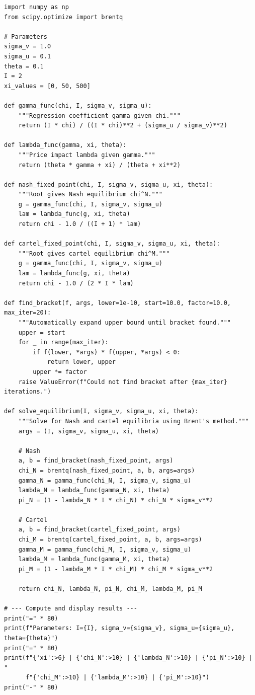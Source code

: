 \begin{lstlisting}[style=pythonstyle]
import numpy as np
from scipy.optimize import brentq

# Parameters
sigma_v = 1.0
sigma_u = 0.1
theta = 0.1
I = 2
xi_values = [0, 50, 500]

def gamma_func(chi, I, sigma_v, sigma_u):
    """Regression coefficient gamma given chi."""
    return (I * chi) / ((I * chi)**2 + (sigma_u / sigma_v)**2)

def lambda_func(gamma, xi, theta):
    """Price impact lambda given gamma."""
    return (theta * gamma + xi) / (theta + xi**2)

def nash_fixed_point(chi, I, sigma_v, sigma_u, xi, theta):
    """Root gives Nash equilibrium chi^N."""
    g = gamma_func(chi, I, sigma_v, sigma_u)
    lam = lambda_func(g, xi, theta)
    return chi - 1.0 / ((I + 1) * lam)

def cartel_fixed_point(chi, I, sigma_v, sigma_u, xi, theta):
    """Root gives cartel equilibrium chi^M."""
    g = gamma_func(chi, I, sigma_v, sigma_u)
    lam = lambda_func(g, xi, theta)
    return chi - 1.0 / (2 * I * lam)

def find_bracket(f, args, lower=1e-10, start=10.0, factor=10.0, max_iter=20):
    """Automatically expand upper bound until bracket found."""
    upper = start
    for _ in range(max_iter):
        if f(lower, *args) * f(upper, *args) < 0:
            return lower, upper
        upper *= factor
    raise ValueError(f"Could not find bracket after {max_iter} iterations.")

def solve_equilibrium(I, sigma_v, sigma_u, xi, theta):
    """Solve for Nash and cartel equilibria using Brent's method."""
    args = (I, sigma_v, sigma_u, xi, theta)

    # Nash
    a, b = find_bracket(nash_fixed_point, args)
    chi_N = brentq(nash_fixed_point, a, b, args=args)
    gamma_N = gamma_func(chi_N, I, sigma_v, sigma_u)
    lambda_N = lambda_func(gamma_N, xi, theta)
    pi_N = (1 - lambda_N * I * chi_N) * chi_N * sigma_v**2

    # Cartel
    a, b = find_bracket(cartel_fixed_point, args)
    chi_M = brentq(cartel_fixed_point, a, b, args=args)
    gamma_M = gamma_func(chi_M, I, sigma_v, sigma_u)
    lambda_M = lambda_func(gamma_M, xi, theta)
    pi_M = (1 - lambda_M * I * chi_M) * chi_M * sigma_v**2

    return chi_N, lambda_N, pi_N, chi_M, lambda_M, pi_M

# --- Compute and display results ---
print("=" * 80)
print(f"Parameters: I={I}, sigma_v={sigma_v}, sigma_u={sigma_u}, theta={theta}")
print("=" * 80)
print(f"{'xi':>6} | {'chi_N':>10} | {'lambda_N':>10} | {'pi_N':>10} | "
      f"{'chi_M':>10} | {'lambda_M':>10} | {'pi_M':>10}")
print("-" * 80)


\end{lstlisting}
